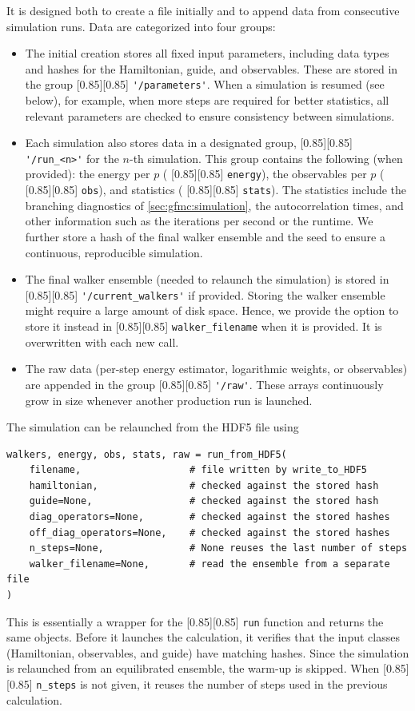 \documentclass{SciPost}
\newcommand{\pyinline}[1]{\begingroup\setlength{\fboxsep}{0pt}%
  \colorbox{gray!15}{\raisebox{0pt}[0.85\ht\strutbox][0.85\dp\strutbox]{%
    \hspace{1pt}\lstinline{#1}\hspace{1pt}}}\endgroup}
\begin{document}
It is designed both to create a file initially and to append data from consecutive simulation runs.
%
Data are categorized into four groups:
\begin{itemize}
	\item[(i)] The initial creation stores all fixed input parameters, including data types and hashes for the Hamiltonian, guide, and observables.
	These are stored in the group \pyinline{'/parameters'}.
	When a simulation is resumed (see below), for example, when more steps are required for better statistics, all relevant parameters are checked to ensure consistency between simulations.
	\item[(ii)] Each simulation also stores data in a designated group, \pyinline{'/run_<n>'} for the $n$-th simulation.
	This group contains the following (when provided): the energy per $p$ (\pyinline{energy}), the observables per $p$ (\pyinline{obs}), and statistics (\pyinline{stats}).
	The statistics include the branching diagnostics of \autoref{sec:gfmc:simulation}, the autocorrelation times, and other information such as the iterations per second or the runtime.
	We further store a hash of the final walker ensemble and the seed to ensure a continuous, reproducible simulation.
	\item[(iii)] The final walker ensemble (needed to relaunch the simulation) is stored in \pyinline{'/current_walkers'} if provided.
	Storing the walker ensemble might require a large amount of disk space.
	Hence, we provide the option to store it instead in \pyinline{walker_filename} when it is provided.
	It is overwritten with each new call.
	\item[(iv)] The raw data (per-step energy estimator, logarithmic weights, or observables) are appended in the group \pyinline{'/raw'}.
	These arrays continuously grow in size whenever another production run is launched.
\end{itemize}


The simulation can be relaunched from the HDF5 file using
\begin{lstlisting}
walkers, energy, obs, stats, raw = run_from_HDF5(
    filename,                   # file written by write_to_HDF5
    hamiltonian,                # checked against the stored hash
    guide=None,                 # checked against the stored hash
    diag_operators=None,        # checked against the stored hashes
    off_diag_operators=None,    # checked against the stored hashes
    n_steps=None,               # None reuses the last number of steps
    walker_filename=None,       # read the ensemble from a separate file
)
\end{lstlisting}
This is essentially a wrapper for the \pyinline{run} function and returns the same objects.
%
Before it launches the calculation, it verifies that the input classes (Hamiltonian, observables, and guide) have matching hashes.
%
Since the simulation is relaunched from an equilibrated ensemble, the warm-up is skipped.
%
When \pyinline{n_steps} is not given, it reuses the number of steps used in the previous calculation.
\end{document}
